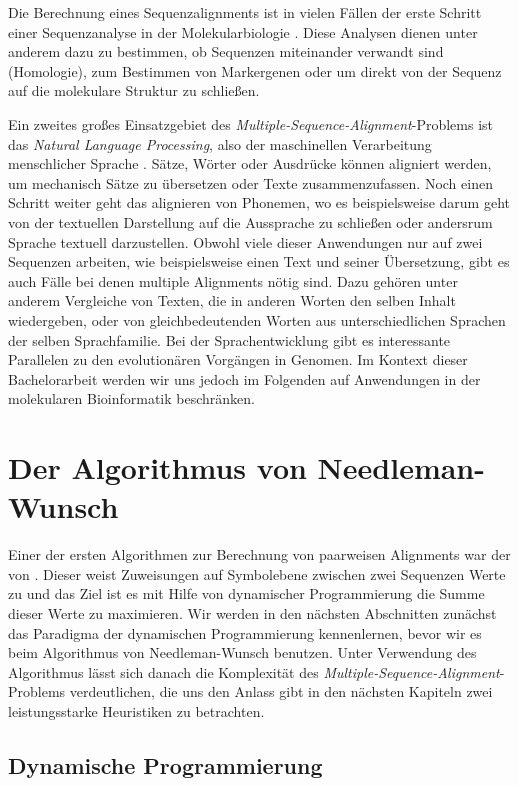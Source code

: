 Die Berechnung eines Sequenzalignments ist in vielen Fällen der erste Schritt einer Sequenzanalyse in der Molekularbiologie \cite{cpm10}. Diese Analysen dienen unter anderem dazu zu bestimmen, ob Sequenzen miteinander verwandt sind (Homologie), zum Bestimmen von Markergenen oder um direkt von der Sequenz auf die molekulare Struktur zu schließen. 

Ein zweites großes Einsatzgebiet des \emph{Multiple-Sequence-Alignment}-Problems ist das \emph{Natural Language Processing}, also der maschinellen Verarbeitung menschlicher Sprache \citep{s10}. Sätze, Wörter oder Ausdrücke können aligniert werden, um mechanisch Sätze zu übersetzen oder Texte zusammenzufassen. Noch einen Schritt weiter geht das alignieren von Phonemen, wo es beispielsweise darum geht von der textuellen Darstellung auf die Aussprache zu schließen oder andersrum Sprache textuell darzustellen. Obwohl viele dieser Anwendungen nur auf zwei Sequenzen arbeiten, wie beispielsweise einen Text und seiner Übersetzung, gibt es auch Fälle bei denen multiple Alignments nötig sind. Dazu gehören unter anderem Vergleiche von Texten, die in anderen Worten den selben Inhalt wiedergeben, oder von gleichbedeutenden Worten aus unterschiedlichen Sprachen der selben Sprachfamilie. Bei der Sprachentwicklung gibt es interessante Parallelen zu den evolutionären Vorgängen in Genomen. Im Kontext dieser Bachelorarbeit werden wir uns jedoch im Folgenden auf Anwendungen in der molekularen Bioinformatik beschränken.  

\section{Der Algorithmus von Needleman-Wunsch}

Einer der ersten Algorithmen zur Berechnung von paarweisen Alignments war der von \cite{nw70}. Dieser weist Zuweisungen auf Symbolebene zwischen zwei Sequenzen Werte zu und das Ziel ist es mit Hilfe von dynamischer Programmierung die Summe dieser Werte zu maximieren. Wir werden in den nächsten Abschnitten zunächst das Paradigma der dynamischen Programmierung kennenlernen, bevor wir es beim Algorithmus von Needleman-Wunsch benutzen. Unter Verwendung des Algorithmus lässt sich danach die Komplexität des \emph{Multiple-Sequence-Alignment}-Problems verdeutlichen, die uns den Anlass gibt in den nächsten Kapiteln zwei leistungsstarke Heuristiken zu betrachten.

\subsection{Dynamische Programmierung}

